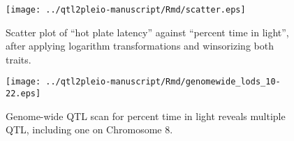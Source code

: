 \documentclass{book}
\begin{document}
\clearpage


\renewcommand{\thefigure}{\textbf{S\arabic{figure}}}
\setcounter{figure}{0}

\begin{figure}
\texttt{[image: ../qtl2pleio-manuscript/Rmd/scatter.eps]}
\caption{Scatter plot of ``hot plate latency'' against ``percent time in
  light'', after applying logarithm transformations and winsorizing
  both traits.}
\label{fig:scatter}
\end{figure}


\begin{figure}
\texttt{[image: ../qtl2pleio-manuscript/Rmd/genomewide\_lods\_10-22.eps]}
\caption{Genome-wide QTL scan for percent time in light reveals
  multiple QTL, including one on Chromosome 8.}
\label{fig:genomewide10-22}
\end{figure}
\end{document}
